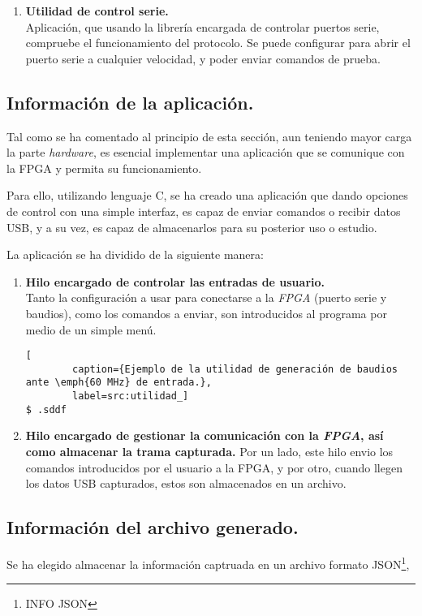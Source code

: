 \begin{enumerate}
    \item \textbf{Utilidad de control serie.} \\
    Aplicación, que usando la librería encargada de controlar puertos serie, compruebe el funcionamiento del protocolo. Se puede configurar para abrir el puerto serie a cualquier velocidad, y poder enviar comandos de prueba.
\end{enumerate}

\subsection{Información de la aplicación.}
Tal como se ha comentado al principio de esta sección, aun teniendo mayor carga la parte \emph{hardware}, es esencial implementar una aplicación que se comunique con la FPGA y permita su funcionamiento.

Para ello, utilizando lenguaje C, se ha creado una aplicación que dando opciones de control con una simple interfaz, es capaz de enviar comandos o recibir datos USB, y a su vez, es capaz de almacenarlos para su posterior uso o estudio.

La aplicación se ha dividido de la siguiente manera:
\begin{enumerate}
    \item \textbf{Hilo encargado de controlar las entradas de usuario.} \\
    Tanto la configuración a usar para conectarse a la \emph{FPGA} (puerto serie y baudios), como los comandos a enviar, son introducidos al programa por medio de un simple menú.

    \begin{lstlisting}[
        caption={Ejemplo de la utilidad de generación de baudios ante \emph{60 MHz} de entrada.},
        label=src:utilidad_]
$ .sddf
    \end{lstlisting}
    
    \item \textbf{Hilo encargado de gestionar la comunicación con la \emph{FPGA}, así como almacenar la trama capturada.}
    Por un lado, este hilo envio los comandos introducidos por el usuario a la FPGA, y por otro, cuando llegen los datos USB capturados, estos son almacenados en un archivo.
\end{enumerate}


\subsection{Información del archivo generado.}
Se ha elegido almacenar la información captruada en un archivo formato JSON\footnote{INFO JSON}, 

